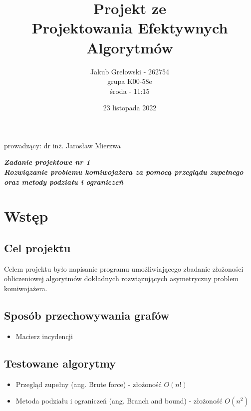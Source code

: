 \documentclass{article}
\title{\vspace{4cm} \textbf{Projekt ze \\ Projektowania Efektywnych Algorytmów}}
\author{Jakub Grelowski - 262754 \\
        grupa K00-58e \\
        środa - 11:15}
\date{23 listopada 2022}
\begin{document}
\maketitle

\begin{center}

\large prowadzący: dr inż. Jarosław Mierzwa 

\vspace{1cm}

\Large \textbf{\textit{Zadanie projektowe nr 1 \\ \vspace{1cm} Rozwiązanie problemu komiwojażera za pomocą przeglądu zupełnego oraz metody podziału i ograniczeń}}     
\end{center}

\vspace{1cm}

\newpage

\tableofcontents

\newpage

\section{Wstęp}
\subsection{Cel projektu}
Celem projektu było napisanie programu umożliwiającego zbadanie złożoności obliczeniowej algorytmów dokładnych rozwiązujących asymetryczny problem komiwojażera. 

\subsection{Sposób przechowywania grafów}
\begin{itemize}
    \item Macierz incydencji
\end{itemize}
\subsection{Testowane algorytmy}
\begin{itemize}
    \item Przegląd zupełny (ang. Brute force) - złożoność $O(n!)$
    \item Metoda podziału i ograniczeń (ang. Branch and bound) - złożoność $O(n^2)$
\end{itemize}
\end{document}
